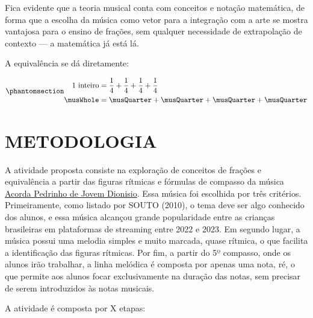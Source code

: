 \documentclass[
  letterpaper,
  DIV=11,
  numbers=noendperiod]{scrreprt}
\begin{document}
Fica evidente que a teoria musical conta com conceitos e notação
matemática, de forma que a escolha da música como vetor para a
integração com a arte se mostra vantajosa para o ensino de frações, sem
qualquer necessidade de extrapolação de contexto --- a matemática já
está lá.

A equivalência se dá diretamente:

\begin{equation}\phantomsection\label{eq-fracao}{
\begin{aligned}
  \text{1 inteiro} &= \frac{1}{4} + \frac{1}{4} + \frac{1}{4} + \frac{1}{4} \\
 \musWhole &= \musQuarter + \musQuarter + \musQuarter + \musQuarter
\end{aligned}
}\end{equation}

\chapter{METODOLOGIA}\label{metodologia}

A atividade proposta consiste na exploração de conceitos de frações e
equivalência a partir das figuras rítmicas e fórmulas de compasso da
música
\href{https://open.spotify.com/intl-pt/track/2sUhjzuc6w4SRFwoC3LvXZ?si=594a3325c9c24baa}{Acorda
Pedrinho de Jovem Dionisio}. Essa música foi escolhida por três
critérios. Primeiramente, como listado por SOUTO (2010), o tema deve ser
algo conhecido dos alunos, e essa música alcançou grande popularidade
entre as crianças brasileiras em plataformas de streaming entre 2022 e
2023. Em segundo lugar, a música possui uma melodia simples e muito
marcada, quase rítmica, o que facilita a identificação das figuras
rítmicas. Por fim, a partir do 5º compasso, onde os alunos irão
trabalhar, a linha melódica é composta por apenas uma nota, ré, o que
permite aos alunos focar exclusivamente na duração das notas, sem
precisar de serem introduzidos às notas musicais.

A atividade é composta por X etapas:
\end{document}
